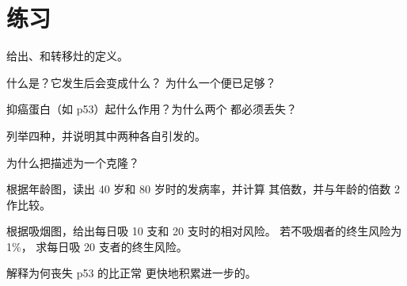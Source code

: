 \section{练习}

\begin{exercise}[$\star$]\label{exo:g11:cancer:1}
给出、和转移灶的定义。
\end{exercise}

\begin{exercise}[$\star$]\label{exo:g11:cancer:2}
什么是？它发生后会变成什么？
为什么一个便已足够？
\end{exercise}

\begin{exercise}[$\star$]\label{exo:g11:cancer:3}
抑癌蛋白（如 p53）起什么作用？为什么两个
都必须丢失？
\end{exercise}

\begin{exercise}[$\star$]\label{exo:g11:cancer:4}
列举四种，并说明其中两种各自引发的。
\end{exercise}

\begin{exercise}[$\star$]\label{exo:g11:cancer:5}
为什么把描述为一个克隆？
\end{exercise}

\begin{exercise}[$\star\star$]\label{exo:g11:cancer:6}
根据年龄图，读出 40 岁和 80 岁时的发病率，并计算
其倍数，并与年龄的倍数 2 作比较。
\end{exercise}

\begin{exercise}[$\star\star$]\label{exo:g11:cancer:7}
根据吸烟图，给出每日吸 10 支和 20 支时的相对风险。
若不吸烟者的终生风险为 1\%，
求每日吸 20 支者的终生风险。
\end{exercise}

\begin{exercise}[$\star\star$]\label{exo:g11:cancer:8}
解释为何丧失 p53 的比正常
更快地积累进一步的。
\end{exercise}

